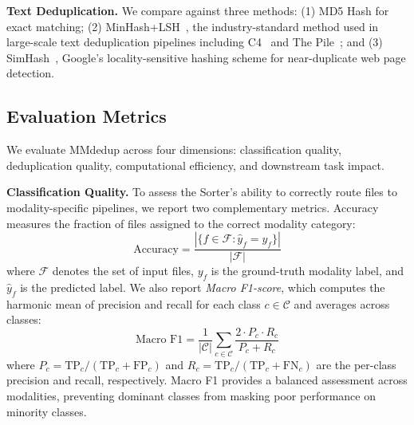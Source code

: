 \documentclass[sigconf, nonacm]{acmart}
\begin{document}
\textbf{Text Deduplication.} We compare against three methods: (1) MD5 Hash for exact matching; (2) MinHash+LSH~\cite{broder1997resemblance}, the industry-standard method used in large-scale text deduplication pipelines including C4~\cite{raffel2020exploring} and The Pile~\cite{gao2020pile}; and (3) SimHash~\cite{charikar2002similarity}, Google's locality-sensitive hashing scheme for near-duplicate web page detection.

\subsection{Evaluation Metrics}

We evaluate MMdedup across four dimensions: classification quality, deduplication quality, computational efficiency, and downstream task impact.

\textbf{Classification Quality.} To assess the Sorter's ability to correctly route files to modality-specific pipelines, we report two complementary metrics. Accuracy measures the fraction of files assigned to the correct modality category:
\begin{equation}
\text{Accuracy} = \frac{|\{f \in \mathcal{F} : \hat{y}_f = y_f\}|}{|\mathcal{F}|}
\end{equation}
where $\mathcal{F}$ denotes the set of input files, $y_f$ is the ground-truth modality label, and $\hat{y}_f$ is the predicted label. We also report \emph{Macro F1-score}, which computes the harmonic mean of precision and recall for each class $c \in \mathcal{C}$ and averages across classes:
\begin{equation}
\text{Macro F1} = \frac{1}{|\mathcal{C}|} \sum_{c \in \mathcal{C}} \frac{2 \cdot P_c \cdot R_c}{P_c + R_c}
\end{equation}
where $P_c = \text{TP}_c / (\text{TP}_c + \text{FP}_c)$ and $R_c = \text{TP}_c / (\text{TP}_c + \text{FN}_c)$ are the per-class precision and recall, respectively. Macro F1 provides a balanced assessment across modalities, preventing dominant classes from masking poor performance on minority classes.
\end{document}
